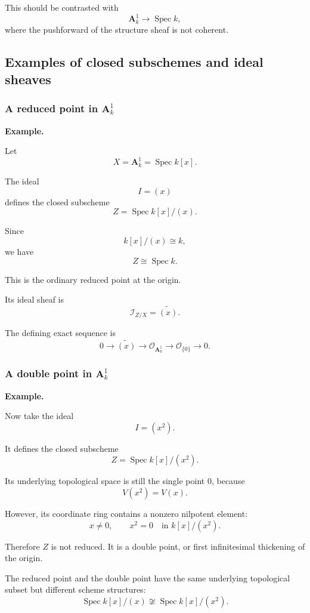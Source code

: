 This should be contrasted with
\[
\mathbf A^1_k\longrightarrow\operatorname{Spec}k,
\]
where the pushforward of the structure sheaf is not coherent.

\subsection{Examples of closed subschemes and ideal sheaves}

\subsubsection{A reduced point in \(\mathbf A^1_k\)}

\textbf{Example.}

Let
\[
X=\mathbf A^1_k=\operatorname{Spec}k[x].
\]

The ideal
\[
I=(x)
\]
defines the closed subscheme
\[
Z=\operatorname{Spec}k[x]/(x).
\]

Since
\[
k[x]/(x)\cong k,
\]
we have
\[
Z\cong\operatorname{Spec}k.
\]

This is the ordinary reduced point at the origin.

Its ideal sheaf is
\[
\mathcal I_{Z/X}=\widetilde{(x)}.
\]

The defining exact sequence is
\[
0
\longrightarrow
\widetilde{(x)}
\longrightarrow
\mathcal O_{\mathbf A^1_k}
\longrightarrow
\mathcal O_{\{0\}}
\longrightarrow
0.
\]

\subsubsection{A double point in \(\mathbf A^1_k\)}

\textbf{Example.}

Now take the ideal
\[
I=(x^2).
\]

It defines the closed subscheme
\[
Z=\operatorname{Spec}k[x]/(x^2).
\]

Its underlying topological space is still the single point \(0\), because
\[
V(x^2)=V(x).
\]

However, its coordinate ring contains a nonzero nilpotent element:
\[
x\neq0,
\qquad
x^2=0
\quad\text{in }k[x]/(x^2).
\]

Therefore \(Z\) is not reduced. It is a double point, or first infinitesimal thickening of the origin.

The reduced point and the double point have the same underlying topological subset but different scheme structures:
\[
\operatorname{Spec}k[x]/(x)
\not\cong
\operatorname{Spec}k[x]/(x^2).
\]

